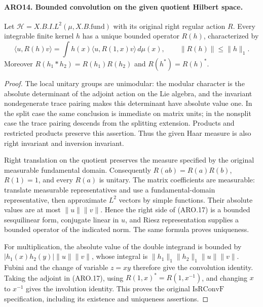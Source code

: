 \paragraph{ARO14. Bounded convolution on the given quotient Hilbert space.}
\label{claim:ARO14}
Let \(\mathcal H=X.B.I.L^2(\mu,X.B.\mathrm{fund})\) with its
original right regular action \(R\).  Every integrable finite kernel
\(h\) has a unique bounded operator \(R(h)\), characterized by
\[
 \langle u,R(h)v\rangle
       =\int h(x)\langle u,R(1,x)v\rangle\,d\mu(x),
 \qquad \|R(h)\|\leq\|h\|_1.                       \tag{ARO.17}
\]
Moreover \(R(h_1*h_2)=R(h_1)R(h_2)\) and
\(R(h^*)=R(h)^*\).
\begin{proof}
The local unitary groups are unimodular: the modular character is
the absolute determinant of the adjoint action on the Lie algebra,
and the invariant nondegenerate trace pairing makes this determinant
have absolute value one.  In the split case the same conclusion is
immediate on matrix units; in the nonsplit case the trace pairing
descends from the splitting extension.  Products and restricted
products preserve this assertion.  Thus the given Haar measure is
also right invariant and inversion invariant.

Right translation on the quotient preserves the measure specified
by the original measurable fundamental domain.  Consequently
\(R(ab)=R(a)R(b)\), \(R(1)=1\), and every \(R(a)\) is unitary.
The matrix coefficients are measurable: translate measurable
representatives and use a fundamental-domain representative,
then approximate \(L^2\) vectors by simple functions.  Their
absolute values are at most \(\|u\|\|v\|\).  Hence the right side
of (ARO.17) is a bounded sesquilinear form, conjugate linear in
\(u\), and Riesz representation supplies a bounded operator of
the indicated norm.  The same formula proves uniqueness.

For multiplication, the absolute value of the double integrand is
bounded by \(|h_1(x)h_2(y)|\|u\|\|v\|\), whose integral is
\(\|h_1\|_1\|h_2\|_1\|u\|\|v\|\).  Fubini and the change
of variable \(z=xy\) therefore give the convolution identity.
Taking the adjoint in (ARO.17), using \(R(1,x)^*=R(1,x^{-1})\),
and changing \(x\) to \(x^{-1}\) gives the involution identity.
This proves the original \(\mathrm{IsRConvF}\) specification,
including its existence and uniqueness assertions.
\end{proof}

